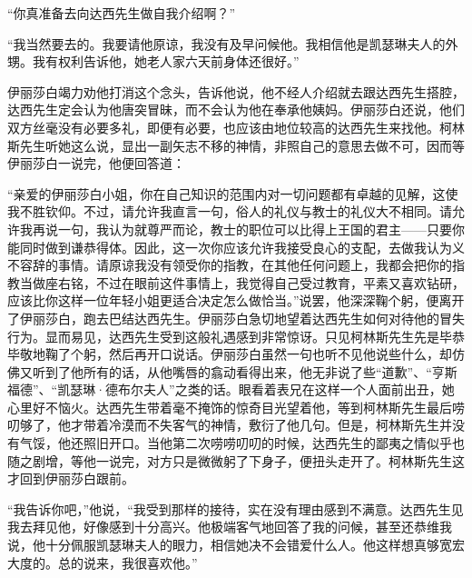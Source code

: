 \par “你真准备去向达西先生做自我介绍啊？”
\par “我当然要去的。我要请他原谅，我没有及早问候他。我相信他是凯瑟琳夫人的外甥。我有权利告诉他，她老人家六天前身体还很好。”
\par 伊丽莎白竭力劝他打消这个念头，告诉他说，他不经人介绍就去跟达西先生搭腔，达西先生定会认为他唐突冒昧，而不会认为他在奉承他姨妈。伊丽莎白还说，他们双方丝毫没有必要多礼，即便有必要，也应该由地位较高的达西先生来找他。柯林斯先生听她这么说，显出一副矢志不移的神情，非照自己的意思去做不可，因而等伊丽莎白一说完，他便回答道：
\par “亲爱的伊丽莎白小姐，你在自己知识的范围内对一切问题都有卓越的见解，这使我不胜钦仰。不过，请允许我直言一句，俗人的礼仪与教士的礼仪大不相同。请允许我再说一句，我认为就尊严而论，教士的职位可以比得上王国的君主——只要你能同时做到谦恭得体。因此，这一次你应该允许我接受良心的支配，去做我认为义不容辞的事情。请原谅我没有领受你的指教，在其他任何问题上，我都会把你的指教当做座右铭，不过在眼前这件事情上，我觉得自己受过教育，平素又喜欢钻研，应该比你这样一位年轻小姐更适合决定怎么做恰当。”说罢，他深深鞠个躬，便离开了伊丽莎白，跑去巴结达西先生。伊丽莎白急切地望着达西先生如何对待他的冒失行为。显而易见，达西先生受到这般礼遇感到非常惊讶。只见柯林斯先生先是毕恭毕敬地鞠了个躬，然后再开口说话。伊丽莎白虽然一句也听不见他说些什么，却仿佛又听到了他所有的话，从他嘴唇的翕动看得出来，他无非说了些“道歉”、“亨斯福德”、“凯瑟琳·德布尔夫人”之类的话。眼看着表兄在这样一个人面前出丑，她心里好不恼火。达西先生带着毫不掩饰的惊奇目光望着他，等到柯林斯先生最后唠叨够了，他才带着冷漠而不失客气的神情，敷衍了他几句。但是，柯林斯先生并没有气馁，他还照旧开口。当他第二次唠唠叨叨的时候，达西先生的鄙夷之情似乎也随之剧增，等他一说完，对方只是微微躬了下身子，便扭头走开了。柯林斯先生这才回到伊丽莎白跟前。
\par “我告诉你吧，”他说，“我受到那样的接待，实在没有理由感到不满意。达西先生见我去拜见他，好像感到十分高兴。他极端客气地回答了我的问候，甚至还恭维我说，他十分佩服凯瑟琳夫人的眼力，相信她决不会错爱什么人。他这样想真够宽宏大度的。总的说来，我很喜欢他。”
